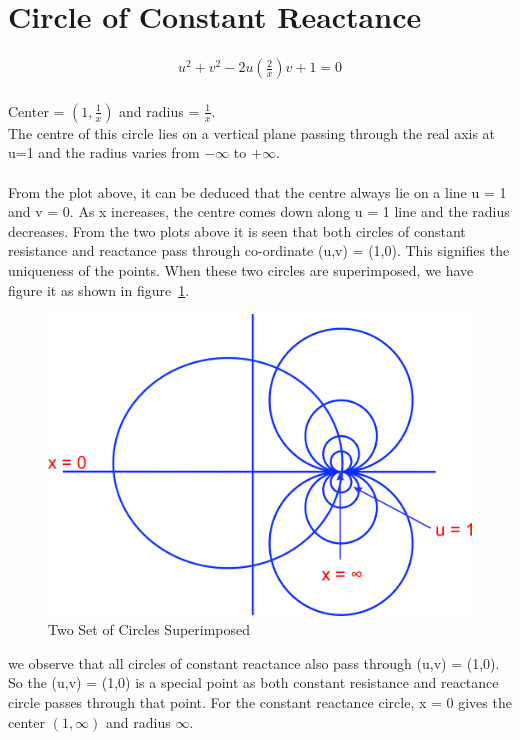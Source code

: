 \section{Circle of Constant Reactance}
\begin{align*}
u^2+v^2-2u\left(\frac{2}{x}\right)v+1=0
\end{align*}\\
Center = $(1,\frac{1}{x})$ and radius = $\frac{1}{x}$. \\
The centre of this circle lies on a vertical plane passing through the real axis at u=1 and the radius varies from $-\infty$ to $+\infty$.\\\\
From the plot above, it can be deduced that the centre always lie on a line u = 1 and v = 0. As x increases, the centre comes down along u = 1 line and the radius decreases.  
From the two plots above it is seen that both circles of constant resistance and reactance pass through co-ordinate (u,v) = (1,0). This signifies the uniqueness of the points.  When these two circles are superimposed, we have figure it as shown in figure~\ref{fig:uytrdbn}.
\begin{figure}[h]
\centering
\includegraphics[width=0.5\linewidth]{./graphics/uytrdbn}
\caption{Two Set of Circles Superimposed}
\label{fig:uytrdbn}
\end{figure}

we observe that all circles of constant reactance also pass through (u,v) = (1,0). So the (u,v) = (1,0) is a special point as both constant resistance and reactance circle passes through that point. For the constant reactance circle, x = 0 gives the center $(1,\infty)$ and radius $\infty$. 

